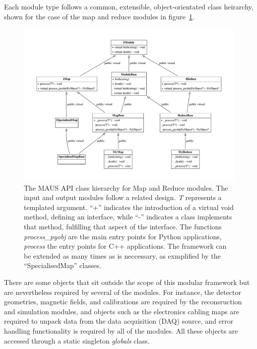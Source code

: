 \documentclass{JINST}
\begin{document}
\noindent Each module type follows a common, extensible, object-orientated class heirarchy, shown for the case of the map and reduce modules in figure~\ref{fig:api}. 

\begin{figure}[!htb]
\centering
\includegraphics[width=1.0\textwidth]{figs/api.pdf}
\caption{The MAUS API class hierarchy for Map and Reduce modules. The input and output modules follow a related design. \emph{T} represents a templated argument. ``+'' indicates the introduction of a virtual void method, defining an interface, while ``-'' indicates a class implements that method, fulfilling that aspect of the interface. The functions \emph{process\_pyobj} are the main entry points for Python applications, \emph{process} the entry points for C++ applications. The framework can be extended as many times as is neccessary, as exmplified by the ``SpecialisedMap'' classes.}
\label{fig:api}
\end{figure}

There are some objects that sit outside the scope of this modular framework but are nevertheless required by several of the modules. For instance,  the detector geometries, magnetic fields, and calibrations are required by the reconsruction and simulation modules, and objects such as the electronics cabling maps are required to unpack data from the data acquisition (DAQ) source, and error handling functionality is required by all of the modules. All these objects are accessed through a static singleton \emph{globals} class. 
\end{document}
